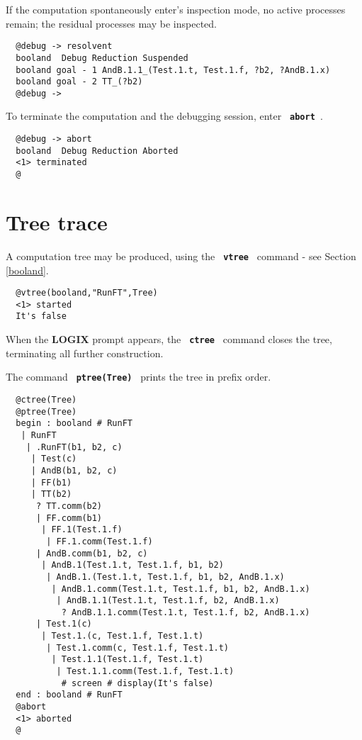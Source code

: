 \documentclass[twoside,10pt]{report}
\begin{document}
\noindent
If the computation spontaneously enter's inspection mode,
no active processes remain; the residual processes may
be inspected.

\begin{verbatim}
  @debug -> resolvent
  booland  Debug Reduction Suspended
  booland goal - 1 AndB.1.1_(Test.1.t, Test.1.f, ?b2, ?AndB.1.x)
  booland goal - 2 TT_(?b2)
  @debug ->
\end{verbatim}

\noindent
To terminate the computation and the debugging session,
enter {\bf \verb+ abort +}.

\begin{verbatim}
  @debug -> abort
  booland  Debug Reduction Aborted
  <1> terminated
  @
\end{verbatim}

\section{Tree trace}
\label{vtree traces}

A computation tree may be produced, using the {\bf \verb+ vtree +}
command - see Section \ref{booland}.

\begin{verbatim}
  @vtree(booland,"RunFT",Tree)
  <1> started
  It's false
\end{verbatim}

\noindent
When the {\bf LOGIX} prompt appears,
the {\bf \verb+ ctree +} command closes the tree, terminating
all further construction.

\noindent
The command {\bf \verb+ ptree(Tree) +} prints the tree in prefix order.

\begin{verbatim}
  @ctree(Tree)
  @ptree(Tree)
  begin : booland # RunFT
   | RunFT
    | .RunFT(b1, b2, c)
     | Test(c)
     | AndB(b1, b2, c)
     | FF(b1)
     | TT(b2)
      ? TT.comm(b2)
      | FF.comm(b1)
       | FF.1(Test.1.f)
        | FF.1.comm(Test.1.f)
      | AndB.comm(b1, b2, c)
       | AndB.1(Test.1.t, Test.1.f, b1, b2)
        | AndB.1.(Test.1.t, Test.1.f, b1, b2, AndB.1.x)
         | AndB.1.comm(Test.1.t, Test.1.f, b1, b2, AndB.1.x)
          | AndB.1.1(Test.1.t, Test.1.f, b2, AndB.1.x)
           ? AndB.1.1.comm(Test.1.t, Test.1.f, b2, AndB.1.x)
      | Test.1(c)
       | Test.1.(c, Test.1.f, Test.1.t)
        | Test.1.comm(c, Test.1.f, Test.1.t)
         | Test.1.1(Test.1.f, Test.1.t)
          | Test.1.1.comm(Test.1.f, Test.1.t)
           # screen # display(It's false)
  end : booland # RunFT
  @abort
  <1> aborted
  @
\end{verbatim}
\end{document}
